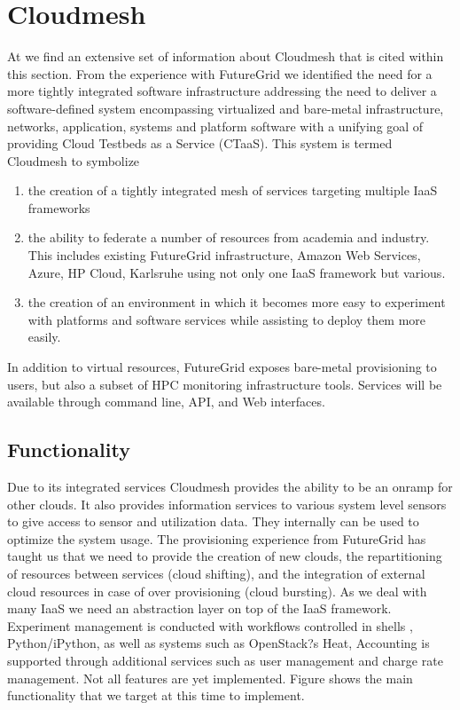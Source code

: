 \documentclass{tex/sig-alternate-2013}
\begin{document}
\section{Cloudmesh}\label{S:cloudmesh}


At \cite{github-cloudmesh} we find an extensive set of information about Cloudmesh that is cited within this section. 
From the experience with FutureGrid we identified the need for a more tightly integrated software infrastructure addressing the need to deliver a software-defined system encompassing virtualized and bare-metal infrastructure, networks, application, systems and platform software with a unifying goal of providing Cloud Testbeds as a Service (CTaaS). This system is termed Cloudmesh to symbolize 


\begin{enumerate}[leftmargin=*,itemsep=0pt,topsep=0pt]


\item the creation of a tightly integrated mesh of services targeting multiple IaaS frameworks 


\item the ability to federate a number of resources from academia and industry. This includes existing FutureGrid infrastructure, Amazon Web Services, Azure, HP Cloud, Karlsruhe using not only one IaaS framework but various. 


\item the creation of an environment in which it becomes more easy to experiment with platforms and software services while assisting to deploy them more easily.  


\end{enumerate}


In addition to virtual resources, FutureGrid exposes bare-metal provisioning to users, but also a subset of HPC monitoring infrastructure tools. Services will be available through command line, API, and Web interfaces.


\subsection{Functionality}


Due to its integrated services Cloudmesh provides the ability to be an onramp for other clouds. It also provides information services to various system level sensors to give access to sensor and utilization data. They internally can be used to optimize the system usage. The provisioning experience from FutureGrid has taught us that we need to provide the creation of new clouds, the repartitioning of resources between services (cloud shifting), and the integration of external cloud resources in case of over provisioning (cloud bursting). As we deal with many IaaS we need an abstraction layer on top of the IaaS framework. Experiment management is conducted with workflows controlled in shells \cite{cmd3}, Python/iPython, as well as systems such as OpenStack?s Heat, Accounting is supported through additional services such as user management and charge rate management. Not all features are yet implemented. Figure \label{F:cm-func} shows the main functionality that we target at this time to implement.
\end{document}
